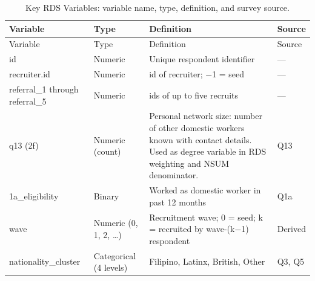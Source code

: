 \documentclass[
  12pt,
  letterpaper,
  DIV=11,
  numbers=noendperiod]{scrreprt}
\begin{document}
\begin{longtable}[]{@{}
  >{\raggedright\arraybackslash}p{}
  >{\raggedright\arraybackslash}p{}
  >{\raggedright\arraybackslash}p{}
  >{\raggedright\arraybackslash}p{}@{}}
\caption{Key RDS Variables: variable name, type, definition, and survey
source.}\label{tbl-rds-vars}\tabularnewline
\toprule\noalign{}
\begin{minipage}[b]{\linewidth}\raggedright
Variable
\end{minipage} & \begin{minipage}[b]{\linewidth}\raggedright
Type
\end{minipage} & \begin{minipage}[b]{\linewidth}\raggedright
Definition
\end{minipage} & \begin{minipage}[b]{\linewidth}\raggedright
Source
\end{minipage} \\
\midrule\noalign{}
\endfirsthead
\toprule\noalign{}
\begin{minipage}[b]{\linewidth}\raggedright
Variable
\end{minipage} & \begin{minipage}[b]{\linewidth}\raggedright
Type
\end{minipage} & \begin{minipage}[b]{\linewidth}\raggedright
Definition
\end{minipage} & \begin{minipage}[b]{\linewidth}\raggedright
Source
\end{minipage} \\
\midrule\noalign{}
\endhead
\bottomrule\noalign{}
\endlastfoot
id & Numeric & Unique respondent identifier & --- \\
recruiter.id & Numeric & id of recruiter; −1 = seed & --- \\
referral\_1 through referral\_5 & Numeric & ids of up to five recruits &
--- \\
q13 (2f) & Numeric (count) & Personal network size: number of other
domestic workers known with contact details. Used as degree variable in
RDS weighting and NSUM denominator. & Q13 \\
1a\_eligibility & Binary & Worked as domestic worker in past 12 months &
Q1a \\
wave & Numeric (0, 1, 2, \ldots) & Recruitment wave; 0 = seed; k =
recruited by wave-(k−1) respondent & Derived \\
nationality\_cluster & Categorical (4 levels) & Filipino, Latinx,
British, Other & Q3, Q5 \\
\end{longtable}
\end{document}
